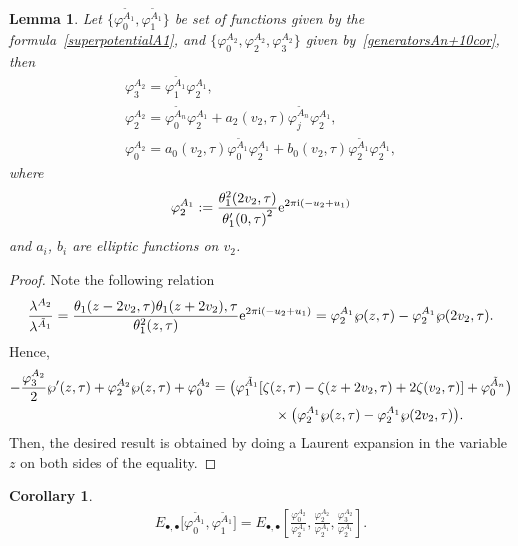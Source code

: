 \documentclass[pdftex]{sigma}%
\numberwithin{equation}{section}
\newtheorem{Corollary}[Theorem]{Corollary}
\newtheorem{Lemma}[Theorem]{Lemma}
\begin{document}
\begin{Lemma}
{\sloppy
Let $\big\{\varphi_0^{\tilde A_1 },\varphi_1^{\tilde A_1 }\big\}$ be set of functions given by the formula~\eqref{superpotentialA1}, and $\big\{\varphi_0^{A_{2}},\varphi_2^{A_{2}},\varphi_3^{A_{2}}\big\}$ given by~\eqref{generatorsAn+10cor}, then
\begin{gather*}
\varphi_{3}^{A_{2}}=\varphi_{1}^{\tilde A_{1}}\varphi_{2}^{A_{1}},\\
\varphi_{2}^{A_{2}}=\varphi_{0}^{\tilde A_{n}}\varphi_{2}^{A_{1}}+ a_2(v_2,\tau)\varphi_{j}^{\tilde A_{n}}\varphi_{2}^{A_{1}},\\
\varphi_{0}^{A_{2}}= a_0(v_2,\tau)\varphi_{0}^{\tilde A_{1}}\varphi_{2}^{A_{1}}+b_0(v_2,\tau)\varphi_{2}^{\tilde A_{1}}\varphi_{2}^{A_{1}},
\end{gather*}}
where
\begin{gather*}
\varphi_2^{A_1}:=\frac{\theta_1^2(2v_{2},\tau)}{{\theta_1^{\prime}(0,\tau)}^2}{\rm e}^{2\pi {\rm i} (-u_2+u_1)}
\end{gather*}
and $a_i$, $b_i$ are elliptic functions on $v_{2}$.

\end{Lemma}
\begin{proof}
Note the following relation
\begin{gather*}
\frac{\lambda^{A_{2}}}{\lambda^{\tilde A_1}}=\frac{\theta_1(z-2v_{2},\tau)\theta_1(z+2v_{2}),\tau} {\theta_1^2(z,\tau)}{\rm e}^{2\pi {\rm i}(-u_2+u_1)}
=\varphi_2^{A_1}\wp(z,\tau)-\varphi_2^{A_1}\wp(2v_2,\tau).
\end{gather*}
Hence,
\begin{gather*}
-\frac{\varphi_{3}^{A_{2}}}{2}\wp^{\prime}(z,\tau)+\varphi_{2}^{A_{2}}\wp(z,\tau)+\varphi_{0}^{A_{2}}
=\big(\varphi_{1}^{\tilde A_1}[\zeta(z,\tau)-\zeta(z+2v_{2},\tau)+2\zeta(v_2,\tau)]+\varphi_0^{\tilde A_n}\big)
\\ \hphantom{-\frac{\varphi_{3}^{A_{2}}}{2}\wp^{\prime}(z,\tau)+ \varphi_{2}^{A_{2}}\wp(z,\tau)+\varphi_{0}^{A_{2}}=}
{}\times\big(\varphi_2^{A_1}\wp(z,\tau)-\varphi_2^{A_1}\wp(2v_{2},\tau)\big).
\end{gather*}
Then, the desired result is obtained by doing a Laurent expansion in the variable $z$ on both sides of the equality.
\end{proof}

\begin{Corollary}
\begin{gather*}
E_{\bullet,\bullet}\big[\varphi_0^{\tilde A_1 },\varphi_1^{\tilde A_1 }\big]=E_{\bullet,\bullet}\left[\frac{\varphi_0^{A_{2}}}{\varphi_2^{A_1}}, \frac{\varphi_2^{A_{2}}}{\varphi_2^{A_1}},\frac{\varphi_3^{A_{2}}}{\varphi_2^{A_1}}\right].
\end{gather*}
\end{Corollary}
\end{document}
